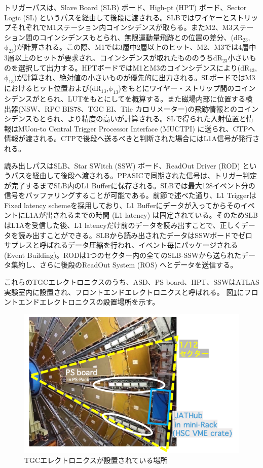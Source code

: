 トリガーパスは、Slave Board (SLB) ボード、High-pt (HPT) ボード、Sector Logic (SL) というパスを経由して後段に渡される。SLBではワイヤーとストリップそれぞれでM1ステーション内コインシデンスが取らる。またM2、M3ステーション間のコインシデンスもとられ、無限運動量飛跡との位置の差分、($\mathrm{dR_{23}}$,$\mathrm{\phi_{23}}$)が計算される。この際、M1では3層中2層以上のヒット、M2、M3では4層中3層以上のヒットが要求され、コインシデンスが取れたもののうち$\mathrm{dR_{23}}$小さいものを選択して出力する。HPTボードではM1とM3のコインシデンスにより($\mathrm{dR_{13}}$,$\mathrm{\phi_{13}}$)が計算され、絶対値の小さいものが優先的に出力される。SLボードではM3におけるヒット位置および($\mathrm{dR_{13}}$,$\mathrm{\phi_{13}}$)をもとにワイヤー・ストリップ間のコインシデンスがとられ、LUTをもとにして\pt を概算する。また磁場内部に位置する検出器(NSW、RPC BIS78、TGC EI、Tile カロリメーター)の飛跡情報とのコインシデンスもとられ、より精度の高い\pt が計算される。SLで得られた入射位置と\pt 情報はMUon-to Central Trigger Processor Interface (MUCTPI) に送られ、CTPへ情報が渡される。CTPで後段へ送るべきと判断された場合にはL1A信号が発行される。

読み出しパスはSLB、Star SWitch (SSW) ボード、ReadOut Driver (ROD) というパスを経由して後段へ渡される。PPASICで同期された信号は、トリガー判定が完了するまでSLB内のL1 Bufferに保存される。SLBでは最大128イベント分の信号をバッファリングすることが可能である。前節で述べた通り、L1 TriggerはFixed latency schemeを採用しており、L1 Bufferにデータが入ってからそのイベントにL1Aが出されるまでの時間 (L1 latency) は固定されている。そのためSLBはL1Aを受信した後、L1 latencyだけ前のデータを読み出すことで、正しくデータを読み出すことができる。SLBから読み出されたデータはSSWボードでゼロサプレスと呼ばれるデータ圧縮を行われ、イベント毎にパッケージされる (Event Building)。RODは1つのセクター内の全てのSLB-SSWから送られたデータ集約し、さらに後段のReadOut System (ROS) へとデータを送信する。

これらのTGCエレクトロニクスのうち、ASD、PS board、HPT、SSWはATLAS実験室内に設置され、フロントエンドエレクトロニクスと呼ばれる。
図\ref{TGC_elec_mount}にフロントエンドエレクトロニクスの設置場所を示す。

\begin{figure} 
\centering
\includegraphics[width=16cm]{fig/Intro/TGC_elec_mount.png}
\caption[TGCエレクトロニクスが設置されている場所]{TGCエレクトロニクスが設置されている場所}
\label{TGC_elec_mount}
\end{figure}

